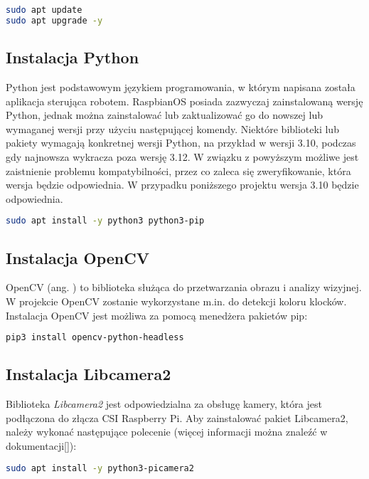 \begin{lstlisting}[language=bash]
sudo apt update
sudo apt upgrade -y
\end{lstlisting}

\subsection{Instalacja Python}
Python jest podstawowym językiem programowania, w którym napisana została aplikacja sterująca robotem. RaspbianOS posiada zazwyczaj zainstalowaną wersję Python, jednak można zainstalować lub zaktualizować go do nowszej lub wymaganej wersji przy użyciu następującej komendy. Niektóre biblioteki lub pakiety wymagają konkretnej wersji Python, na przykład w wersji 3.10, podczas gdy najnowsza wykracza poza wersję 3.12. W związku z powyższym możliwe jest zaistnienie problemu kompatybilności, przez co zaleca się zweryfikowanie, która wersja będzie odpowiednia. W przypadku poniższego projektu wersja 3.10 będzie odpowiednia. 

\begin{lstlisting}[language=bash]
sudo apt install -y python3 python3-pip
\end{lstlisting}

\subsection{Instalacja OpenCV}
OpenCV (ang. ) to biblioteka służąca do przetwarzania obrazu i analizy wizyjnej. W projekcie OpenCV zostanie wykorzystane m.in. do detekcji koloru klocków. Instalacja OpenCV jest możliwa za pomocą menedżera pakietów pip:

\begin{lstlisting}[language=bash]
pip3 install opencv-python-headless
\end{lstlisting}

\subsection{Instalacja Libcamera2}
Biblioteka \textit{Libcamera2} jest odpowiedzialna za obsługę kamery, która jest podłączona do złącza CSI Raspberry Pi. Aby zainstalować pakiet Libcamera2, należy wykonać następujące polecenie (więcej informacji można znaleźć w dokumentacji[\cite{bib:manualLibcamera2}]):

\begin{lstlisting}[language=bash]
    sudo apt install -y python3-picamera2
\end{lstlisting}

